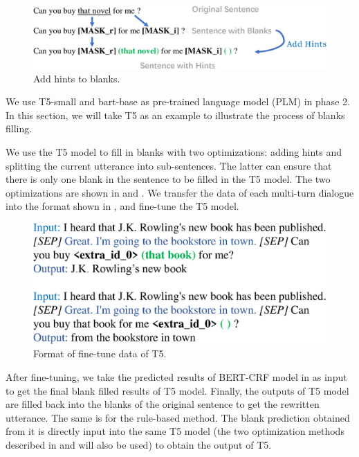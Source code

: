 \begin{figure}[th]
        \centering
        \includegraphics[width=1.0\columnwidth]{add-hint.eps}
        \caption{Add hints to blanks.}
        \label{fig:add-hint}
\end{figure}

We use T5-small \citep{2020t5} and bart-base \citep{DBLP:conf/acl/LewisLGGMLSZ20} as pre-trained language model (PLM) in phase 2. In this section, we will take T5 as an example to illustrate the process of blanks filling. 


We use the T5 model to fill in blanks
with two optimizations: adding hints and splitting the current utterance into sub-sentences. 
The latter can ensure that there is only one blank in the sentence to be filled in the T5 model. The two optimizations are shown in  and . We transfer the data of each multi-turn dialogue into the format shown in , and fine-tune the T5 model.

\begin{figure}[th]
        \centering
        \includegraphics[width=1.0\columnwidth]{T5-format.eps}
        \caption{Format of fine-tune data of T5.}
        \label{fig:T5-format}
\end{figure}

After fine-tuning, we take the predicted results of BERT-CRF model in  as input to get the final blank filled results of T5 model. Finally, the outputs of T5 model are filled back into the blanks of the original sentence to get the rewritten utterance. 
The same is for the rule-based method.
 The blank prediction obtained from it is directly input into the same T5 model (the two optimization methods described in  and  will also be used) to obtain the output of T5.
